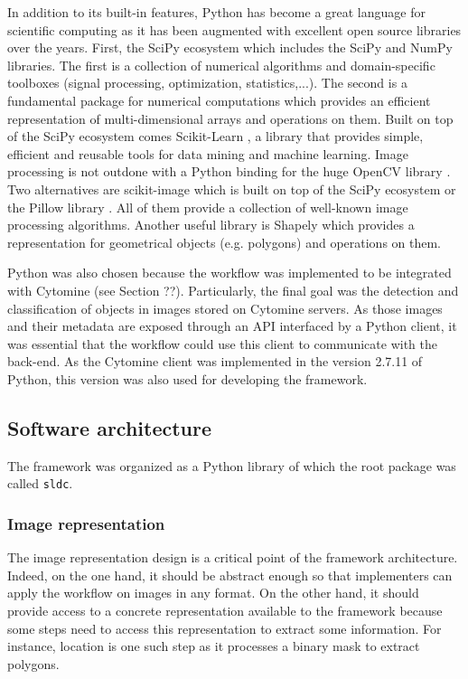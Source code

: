 In addition to its built-in features, Python has become a great language for scientific computing as it has been augmented with excellent open source libraries over the years. First, the SciPy ecosystem which includes the SciPy \cite{oliphant:2007} and NumPy \cite{vanderwalt:2011} libraries. The first is a collection of numerical algorithms and domain-specific toolboxes (signal processing, optimization, statistics,...). The second is a fundamental package for numerical computations which provides an efficient representation of multi-dimensional arrays and operations on them. Built on top of the SciPy ecosystem comes Scikit-Learn \cite{pedregosa:2011}, a library that provides simple, efficient and reusable tools for data mining and machine learning. Image processing is not outdone with a Python binding for the huge OpenCV library \cite{opencv_library}. Two alternatives are scikit-image \cite{scikit-image} which is built on top of the SciPy ecosystem or the Pillow library \cite{pillow}. All of them provide a collection of well-known image processing algorithms. Another useful library is Shapely \cite{shapely} which provides a representation for geometrical objects (e.g. polygons) and operations on them. 

Python was also chosen because the workflow was implemented to be integrated with Cytomine (see Section ??). Particularly, the final goal was the detection and classification of objects in images stored on Cytomine servers. As those images and their metadata are exposed through an API interfaced by a Python client, it was essential that the workflow could use this client to communicate with the back-end. As the Cytomine client was implemented in the version 2.7.11 of Python, this version was also used for developing the framework. 

\subsection{Software architecture}
\label{ssec:work_arch}
The framework was organized as a Python library of which the root package was called \texttt{sldc}. 

\subsubsection{Image representation} 
\label{sssec:work_image_repr}
The image representation design is a critical point of the framework architecture. Indeed, on the one hand, it should be abstract enough so that implementers can apply the workflow on images in any format. On the other hand, it should provide access to a concrete representation available to the framework because some steps need to access this representation to extract some information. For instance, location is one such step as it processes a binary mask to extract polygons. 


